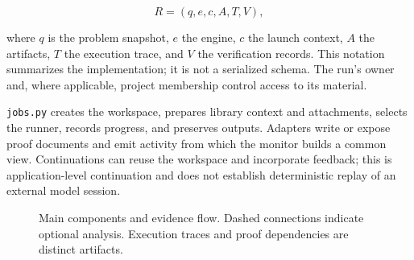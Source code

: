 \documentclass[11pt,a4paper]{article}
\begin{document}
\[
R=(q,e,c,A,T,V),
\]

where $q$ is the problem snapshot, $e$ the engine, $c$ the launch context, $A$ the artifacts, $T$ the execution trace, and $V$ the verification records. This notation summarizes the implementation; it is not a serialized schema. The run's owner and, where applicable, project membership control access to its material.

\nolinkurl{jobs.py} creates the workspace, prepares library context and attachments, selects the runner, records progress, and preserves outputs. Adapters write or expose proof documents and emit activity from which the monitor builds a common view. Continuations can reuse the workspace and incorporate feedback; this is application-level continuation and does not establish deterministic replay of an external model session.


\begin{figure}[htbp]
\centering
{}
\caption{Main components and evidence flow. Dashed connections indicate
optional analysis. Execution traces and proof dependencies are distinct artifacts.}
\end{figure}
\end{document}
